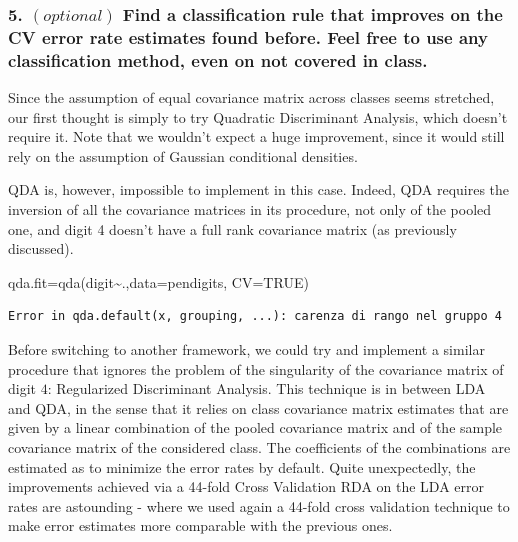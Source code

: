 \documentclass[
  letterpaper,
  DIV=11,
  numbers=noendperiod]{scrartcl}
\newenvironment{Shaded}{\begin{snugshade}}{\end{snugshade}}
\newcommand{\AttributeTok}[1]{\textcolor[rgb]{0.40,0.45,0.13}{#1}}
\newcommand{\ConstantTok}[1]{\textcolor[rgb]{0.56,0.35,0.01}{#1}}
\newcommand{\FunctionTok}[1]{\textcolor[rgb]{0.28,0.35,0.67}{#1}}
\newcommand{\NormalTok}[1]{\textcolor[rgb]{0.00,0.23,0.31}{#1}}
\newcommand{\OtherTok}[1]{\textcolor[rgb]{0.00,0.23,0.31}{#1}}
\newcommand{\SpecialCharTok}[1]{\textcolor[rgb]{0.37,0.37,0.37}{#1}}
\begin{document}
\hypertarget{optional-find-a-classification-rule-that-improves-on-the-cv-error-rate-estimates-found-before.-feel-free-to-use-any-classification-method-even-on-not-covered-in-class.}{%
\subsubsection{\texorpdfstring{5. \((optional)\) Find a classification
rule that improves on the CV error rate estimates found before. Feel
free to use any classification method, even on not covered in
class.}{5. (optional) Find a classification rule that improves on the CV error rate estimates found before. Feel free to use any classification method, even on not covered in class.}}\label{optional-find-a-classification-rule-that-improves-on-the-cv-error-rate-estimates-found-before.-feel-free-to-use-any-classification-method-even-on-not-covered-in-class.}}

Since the assumption of equal covariance matrix across classes seems
stretched, our first thought is simply to try Quadratic Discriminant
Analysis, which doesn't require it. Note that we wouldn't expect a huge
improvement, since it would still rely on the assumption of Gaussian
conditional densities.

QDA is, however, impossible to implement in this case. Indeed, QDA
requires the inversion of all the covariance matrices in its procedure,
not only of the pooled one, and digit 4 doesn't have a full rank
covariance matrix (as previously discussed).

\begin{Shaded}
\begin{Highlighting}[]
\NormalTok{qda.fit}\OtherTok{=}\FunctionTok{qda}\NormalTok{(digit}\SpecialCharTok{\textasciitilde{}}\NormalTok{.,}\AttributeTok{data=}\NormalTok{pendigits, }\AttributeTok{CV=}\ConstantTok{TRUE}\NormalTok{)}
\end{Highlighting}
\end{Shaded}

\begin{verbatim}
Error in qda.default(x, grouping, ...): carenza di rango nel gruppo 4
\end{verbatim}

Before switching to another framework, we could try and implement a
similar procedure that ignores the problem of the singularity of the
covariance matrix of digit \(4\): Regularized Discriminant Analysis.
This technique is in between LDA and QDA, in the sense that it relies on
class covariance matrix estimates that are given by a linear combination
of the pooled covariance matrix and of the sample covariance matrix of
the considered class. The coefficients of the combinations are estimated
as to minimize the error rates by default. Quite unexpectedly, the
improvements achieved via a 44-fold Cross Validation RDA on the LDA
error rates are astounding - where we used again a 44-fold cross
validation technique to make error estimates more comparable with the
previous ones.
\end{document}
